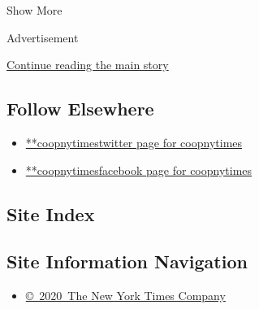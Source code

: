 Show More

Advertisement

\protect\hyperlink{after-mid2}{Continue reading the main story}

\hypertarget{follow-elsewhere}{%
\subsection{Follow Elsewhere}\label{follow-elsewhere}}

\begin{itemize}
\tightlist
\item
  \href{https://twitter.com/coopnytimes}{**coopnytimestwitter page for
  coopnytimes}
\item
  \href{https://www.facebookcorewwwi.onion/coopnytimes}{**coopnytimesfacebook
  page for coopnytimes}
\end{itemize}

\hypertarget{site-index}{%
\subsection{Site Index}\label{site-index}}

\hypertarget{site-information-navigation}{%
\subsection{Site Information
Navigation}\label{site-information-navigation}}

\begin{itemize}
\tightlist
\item
  \href{https://help.nytimes3xbfgragh.onion/hc/en-us/articles/115014792127-Copyright-notice}{©~2020~The
  New York Times Company}
\end{itemize}

